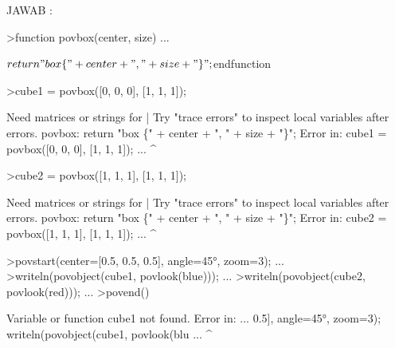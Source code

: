 \documentclass{article}
\begin{document}
\begin{eulernotebook}
\begin{eulercomment}
\begin{eulercomment}
\begin{eulercomment}
\begin{eulercomment}
\begin{eulercomment}
\begin{eulercomment}
\begin{eulercomment}
\begin{eulercomment}
\begin{eulercomment}
\begin{eulercomment}
\begin{eulercomment}
\begin{eulercomment}
\begin{eulercomment}
\begin{eulercomment}
\begin{eulercomment}
\begin{eulercomment}
\begin{eulercomment}
\begin{eulercomment}
\begin{eulercomment}
\begin{eulercomment}
\begin{eulercomment}
\begin{eulercomment}
\begin{eulercomment}
\begin{eulercomment}
\begin{eulercomment}
\begin{eulercomment}
\begin{eulercomment}
\begin{eulercomment}
\begin{eulercomment}
\begin{eulercomment}
\begin{eulercomment}
JAWAB :
\end{eulercomment}
\begin{eulerprompt}
>function povbox(center, size) ...
\end{eulerprompt}
\begin{eulerudf}
  $  return "box \{" + center + ", " + size + "\}";
  $endfunction
\end{eulerudf}
\begin{eulerprompt}
>cube1 = povbox([0, 0, 0], [1, 1, 1]);
\end{eulerprompt}
\begin{euleroutput}
  Need matrices or strings for |
  Try "trace errors" to inspect local variables after errors.
  povbox:
      return "box \{" + center + ", " + size + "\}";
  Error in:
  cube1 = povbox([0, 0, 0], [1, 1, 1]); ...
                                      ^
\end{euleroutput}
\begin{eulerprompt}
>cube2 = povbox([1, 1, 1], [1, 1, 1]);
\end{eulerprompt}
\begin{euleroutput}
  Need matrices or strings for |
  Try "trace errors" to inspect local variables after errors.
  povbox:
      return "box \{" + center + ", " + size + "\}";
  Error in:
  cube2 = povbox([1, 1, 1], [1, 1, 1]); ...
                                      ^
\end{euleroutput}
\begin{eulerprompt}
>povstart(center=[0.5, 0.5, 0.5], angle=45°, zoom=3); ...
>writeln(povobject(cube1, povlook(blue))); ...
>writeln(povobject(cube2, povlook(red))); ...
>povend()
\end{eulerprompt}
\begin{euleroutput}
  Variable or function cube1 not found.
  Error in:
  ... 0.5], angle=45°, zoom=3); writeln(povobject(cube1, povlook(blu ...
                                                       ^
\end{euleroutput}
\begin{eulercomment}

\end{eulercomment}
\end{eulercomment}
\end{eulercomment}
\end{eulercomment}
\end{eulercomment}
\end{eulercomment}
\end{eulercomment}
\end{eulercomment}
\end{eulercomment}
\end{eulercomment}
\end{eulercomment}
\end{eulercomment}
\end{eulercomment}
\end{eulercomment}
\end{eulercomment}
\end{eulercomment}
\end{eulercomment}
\end{eulercomment}
\end{eulercomment}
\end{eulercomment}
\end{eulercomment}
\end{eulercomment}
\end{eulercomment}
\end{eulercomment}
\end{eulercomment}
\end{eulercomment}
\end{eulercomment}
\end{eulercomment}
\end{eulercomment}
\end{eulercomment}
\end{eulercomment}
\end{eulernotebook}
\end{document}
